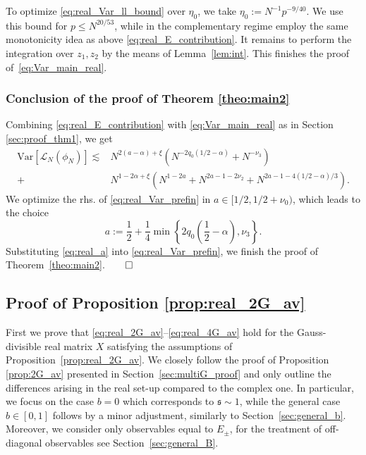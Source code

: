 \documentclass[10pt]{amsart}
\numberwithin{equation}{section}
\newcommand{\Var}{\mathrm{Var}}
\begin{document}
To optimize \eqref{eq:real_Var_ll_bound} over $\eta_0$, we take $\eta_0:=N^{-1}p^{-9/40}$.
We use this bound for $p\le N^{20/53}$, while in the complementary regime employ the same monotonicity idea as above \eqref{eq:real_E_contribution}. It remains to perform the integration over $z_1,z_2$ by the means of Lemma~\ref{lem:int}. This finishes the proof of~\eqref{eq:Var_main_real}.


\subsubsection{Conclusion of the proof of Theorem \ref{theo:main2}} Combining \eqref{eq:real_E_contribution} with \eqref{eq:Var_main_real} as in Section \ref{sec:proof_thm1}, we get
\begin{equation}
\begin{split}
\Var\left[\mathcal{L}_N(\phi_N)\right] \lesssim &N^{2(a-\alpha)+\xi} \left( N^{-2q_0(1/2-\alpha)} + N^{-\nu_3}\right)\\
 + &N^{1-2\alpha+\xi}\left(N^{1-2a} +N^{2a-1-2\nu_2} + N^{2a-1-4(1/2-\alpha)/3}\right).
\end{split}
\label{eq:real_Var_prefin}
\end{equation}
We optimize the rhs. of \eqref{eq:real_Var_prefin} in $a\in [1/2,1/2+\nu_0)$, which leads to the choice
\begin{equation}
a:=\frac{1}{2}+\frac{1}{4}\min\left\lbrace 2q_0\left(\frac{1}{2}-\alpha\right), \nu_3\right\rbrace.
\label{eq:real_a}
\end{equation}
Substituting \eqref{eq:real_a} into \eqref{eq:real_Var_prefin}, we finish the proof of Theorem~\ref{theo:main2}.\hfill $\qed$


\subsection{Proof of Proposition \ref{prop:real_2G_av}}\label{sec:real_local_laws}

First we prove that \eqref{eq:real_2G_av}--\eqref{eq:real_4G_av} hold for the Gauss-divisible real matrix $X$ satisfying the assumptions of Proposition~\ref{prop:real_2G_av}. We closely follow the proof of Proposition \ref{prop:2G_av} presented in Section~\ref{sec:multiG_proof} and only outline the differences arising in the real set-up compared to the complex one. In particular, we focus on the case $b=0$ which corresponds to $\mathfrak{s}\sim 1$, while the general case $b\in [0,1]$ follows by a minor adjustment, similarly to Section~\ref{sec:general_b}. Moreover, we consider only observables equal to $E_\pm$, for the treatment of off-diagonal observables see Section~\ref{sec:general_B}.
\end{document}
